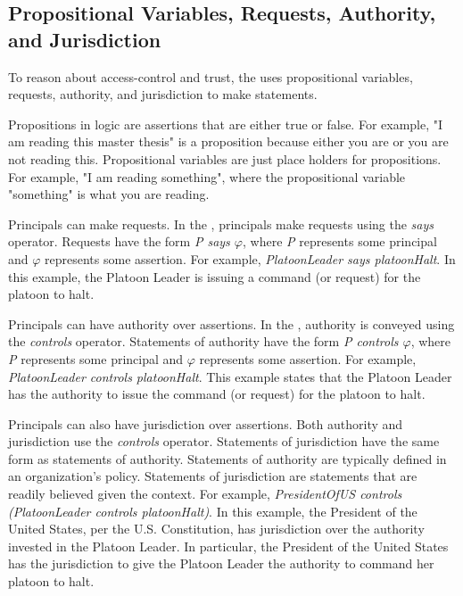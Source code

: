 \documentclass[../../main/main.tex]{subfiles}
\begin{document}
\subsection{Propositional Variables, Requests, Authority, and Jurisdiction}\label{ssec:statementsacl}
To reason about access-control and trust, the  uses propositional variables, requests, authority, and jurisdiction to make statements.

Propositions in logic are assertions that are either true or false.  For example, "I am reading this master thesis" is a proposition because either you are or you are not reading this.  Propositional variables are just place holders for propositions.  For example, "I am reading something", where the propositional variable "something" is what you are reading.

Principals can make requests.  In the , principals make requests using the \textit{says} operator.  Requests have the form \textit{P says $\varphi$},  where \textit{P} represents some principal and \textit{$\varphi$} represents some assertion.  For example, \textit{PlatoonLeader says platoonHalt}.  In this example, the Platoon Leader is issuing a command (or request) for the platoon to halt.  

Principals can have authority over assertions.  In the , authority is conveyed using the \textit{controls} operator.  Statements of authority have the form \textit{P controls $\varphi$},  where \textit{P} represents some principal and \textit{$\varphi$} represents some assertion.  For example, \textit{PlatoonLeader controls platoonHalt}.  This example states that the Platoon Leader has the authority to issue the command (or request) for the platoon to halt. 

Principals can also have jurisdiction over assertions.  Both authority and jurisdiction use the \textit{controls} operator.  Statements of jurisdiction have the same form as statements of authority.  Statements of authority are typically defined in an organization's policy.  Statements of jurisdiction are statements that are readily believed given the context.  For example, \textit{PresidentOfUS controls (PlatoonLeader controls platoonHalt)}.  In this example, the President of the United States, per the U.S. Constitution, has jurisdiction over the authority invested in the Platoon Leader.  In particular, the President of the United States has the jurisdiction to give the Platoon Leader the authority to command her platoon to halt.
\end{document}
